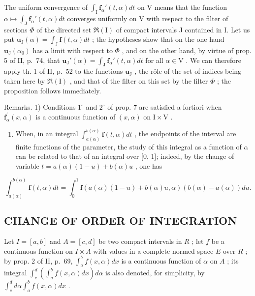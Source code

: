 The uniform convergence of \(\int_{\mathrm{I}} \mathbf{f}_{\alpha}'(t, \alpha) dt\) on V means that the function \(\alpha \mapsto \int_{\mathrm{J}} \mathbf{f}_{\alpha}'(t, \alpha) dt\) converges uniformly on V with respect to the filter of sections \(\Phi\) of the directed set \(\Re(\mathrm{I})\) of compact intervals J contained in I. Let us put \(\mathbf{u}_{\mathrm{J}}(\alpha) = \int_{\mathrm{J}} \mathbf{f}(t, \alpha) dt\) ; the hypotheses show that on the one hand \(\mathbf{u}_{\mathrm{J}}(\alpha_0)\) has a limit with respect to \(\Phi\) , and on the other hand, by virtue of prop. 5 of II, p.~74, that \(\mathbf{u}_{\mathrm{J}}'(\alpha) = \int_{\mathrm{J}} \mathbf{f}_{\alpha}'(t, \alpha) dt\) for all \(\alpha \in \mathrm{V}\) . We can therefore apply th. 1 of II, p.~52 to the functions \(\mathbf{u}_{\mathrm{J}}\) , the rôle of the set of indices being taken here by \(\Re(\mathrm{I})\) , and that of the filter on this set by the filter \(\Phi\) ; the proposition follows immediately.

Remarks. 1) Conditions \(1^{\circ}\) and \(2^{\circ}\) of prop. 7 are satisfied a fortiori when \(\mathbf{f}_{\alpha}^{\prime}(x,\alpha)\) is a continuous function of \((x,\alpha)\) on \(\mathrm{I} \times \mathrm{V}\) .

\begin{enumerate}
\def\labelenumi{\arabic{enumi})}
\setcounter{enumi}{1}
\tightlist
\item
  When, in an integral \(\int_{a(\alpha)}^{b(\alpha)}\mathbf{f}(t,\alpha)dt\) , the endpoints of the interval are finite functions of the parameter, the study of this integral as a function of \(\alpha\) can be related to that of an integral over {[}0, 1{]}; indeed, by the change of variable \(t = a(\alpha)(1 - u) + b(\alpha)u\) , one has
\end{enumerate}

\[
\int_ {a (\alpha)} ^ {b (\alpha)} \mathbf {f} (t, \alpha) d t = \int_ {0} ^ {1} \mathbf {f} (a (\alpha) (1 - u) + b (\alpha) u, \alpha) (b (\alpha) - a (\alpha)) d u.
\]

\subsection{CHANGE OF ORDER OF INTEGRATION}

Let \(I = [a, b]\) and \(A = [c, d]\) be two compact intervals in \(R\) ; let \(f\) be a continuous function on \(I \times A\) with values in a complete normed space \(E\) over \(R\) ; by prop. 2 of II, p.~69, \(\int_{a}^{b} f(x, \alpha) dx\) is a continuous function of \(\alpha\) on \(A\) ; its integral \(\int_{c}^{d} \left( \int_{a}^{b} f(x, \alpha) dx \right) d\alpha\) is also denoted, for simplicity, by \(\int_{c}^{d} d\alpha \int_{a}^{b} f(x, \alpha) dx\) .

